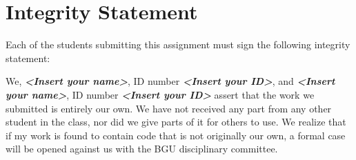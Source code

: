 \documentclass[a4paper]{article}
\theoremstyle{remarksStyle}
\theoremstyle{questionStyle}
\theoremstyle{answerStyle}
\begin{document}
\newpage
\section{Integrity Statement}
Each of the students submitting this assignment must sign the following integrity statement:

\vspace{5ex}
\begin{boxxed}
\textcolor{CB_blue}{
We, \textbf{\textit{<Insert your name>}}, ID number \textbf{\textit{<Insert your ID>}}, and \textbf{\textit{<Insert your name>}}, ID number \textbf{\textit{<Insert your ID>}} assert that the work we submitted is entirely our own.
We have not received any part from any other student in the class, nor did we give parts of it for others to use.
We realize that if my work is found to contain code that is not originally our own, a formal case will be opened against us with the BGU disciplinary committee.
}
\end{boxxed}

\vspace{1cm}

\end{document}
